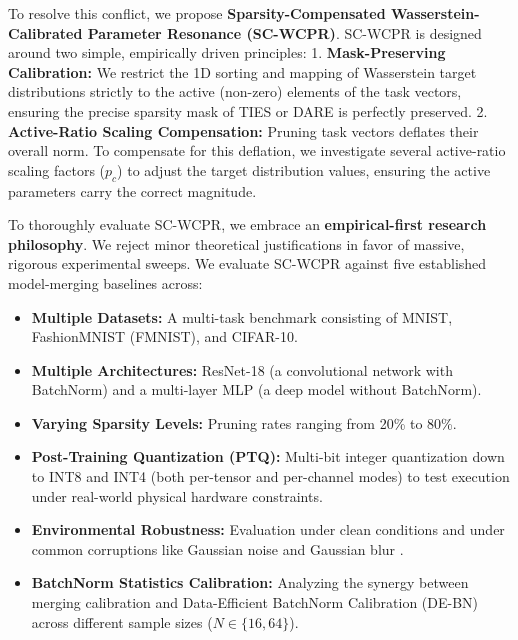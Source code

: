 \documentclass{article}
\theoremstyle{plain}
\theoremstyle{definition}
\theoremstyle{remark}
\begin{document}
To resolve this conflict, we propose \textbf{Sparsity-Compensated Wasserstein-Calibrated Parameter Resonance (SC-WCPR)}. SC-WCPR is designed around two simple, empirically driven principles:
1. \textbf{Mask-Preserving Calibration:} We restrict the 1D sorting and mapping of Wasserstein target distributions strictly to the active (non-zero) elements of the task vectors, ensuring the precise sparsity mask of TIES or DARE is perfectly preserved.
2. \textbf{Active-Ratio Scaling Compensation:} Pruning task vectors deflates their overall norm. To compensate for this deflation, we investigate several active-ratio scaling factors ($p_c$) to adjust the target distribution values, ensuring the active parameters carry the correct magnitude.

To thoroughly evaluate SC-WCPR, we embrace an \textbf{empirical-first research philosophy}. We reject minor theoretical justifications in favor of massive, rigorous experimental sweeps. We evaluate SC-WCPR against five established model-merging baselines across:
\begin{itemize}
  \item \textbf{Multiple Datasets:} A multi-task benchmark consisting of MNIST, FashionMNIST (FMNIST), and CIFAR-10.
  \item \textbf{Multiple Architectures:} ResNet-18 (a convolutional network with BatchNorm) and a multi-layer MLP (a deep model without BatchNorm).
  \item \textbf{Varying Sparsity Levels:} Pruning rates ranging from 20\% to 80\%.
  \item \textbf{Post-Training Quantization (PTQ):} Multi-bit integer quantization down to INT8 and INT4 (both per-tensor and per-channel modes) to test execution under real-world physical hardware constraints.
  \item \textbf{Environmental Robustness:} Evaluation under clean conditions and under common corruptions like Gaussian noise and Gaussian blur \cite{hendrycks2019benchmarking}.
  \item \textbf{BatchNorm Statistics Calibration:} Analyzing the synergy between merging calibration and Data-Efficient BatchNorm Calibration (DE-BN) \cite{submission10} across different sample sizes ($N \in \{16, 64\}$).
\end{itemize}
\end{document}
